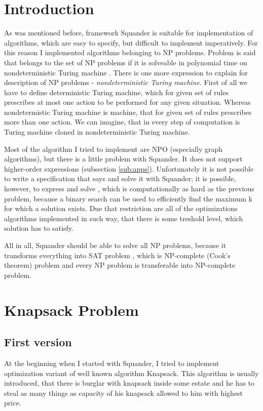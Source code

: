 \documentclass[11pt,twoside,a4paper]{book}
\begin{document}
\section{Introduction}
As was mentioned before, framework Squander is suitable for implementation of
algorithms, which are easy to specify, but difficult to implement imperatively.
For this reason I implemented algorithms belonging to NP problems. Problem is
said that belongs to the set of NP problems if it is solveable in polynomial
time on nondeterministic Turing machine \cite{schmidt:paa}. There is one more
expression to explain for description of NP problems - \textit{nondeterministic Turing
machine}. First of all we have to define deterministic Turing machine, which for
given set of rules prescribes at most one action to be performed for any given
situation. Whereas nondetermistic Turing machine is machine, that for given set
of rules prescribes more than one action. We can imagine, that in every step of
computation is Turing machine cloned in nondeterministic Turing machine.

Most of the algorithm I tried to implement are NPO (especially graph
algorithms), but there is a little problem with Squander. It does not support
higher-order expressions (subsection \ref{sub:apps}). Unfortunately it is not
possible to write a specification that says  and solve it with
Squander; it is possible, however, to express and solve , which is computationally as hard as the previous
problem, because a binary search can be used to efficiently find the maximum k
for which a solution exists. Due that restriction are all of the optimizations
algorithms implemented in such way, that there is some treshold level, which
solution has to satisfy.


All in all, Squander should be able to solve all NP problems, because it
transforms everything into SAT problem \cite{schmidt:paa}, which is NP-complete
(Cook's theorem) problem and every NP problem is transferable into NP-complete problem.
\section{Knapsack Problem}

\subsection{First version}
At the beginning when I started  with Squander, I tried to
implement optimization variant of well known algorithm Knapsack. This algorithm
is usually introduced, that there is burglar with knapsack inside some estate and he has to steal
as many things as capacity of his knapsack allowed to him with highest price. 
\end{document}
